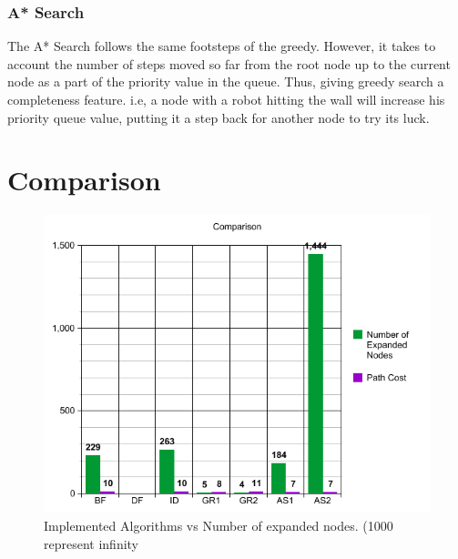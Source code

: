 \subsubsection{A* Search}
The A* Search follows the same footsteps of the greedy. However, it takes to account the number of steps moved so far from the root node up to the current node as a part of the priority value in the queue. Thus, giving greedy search a completeness feature. i.e, a node with a robot hitting the wall will increase his priority queue value, putting it a step back for another node to try its luck.

\newpage
\section{Comparison}
\begin{figure}[H] 
   	\centering
	\includegraphics[scale=0.6]{images/Graph} 
    \caption{Implemented Algorithms vs Number of expanded nodes. (1000 represent infinity}
    \label{fig:graph} 
\end{figure}

